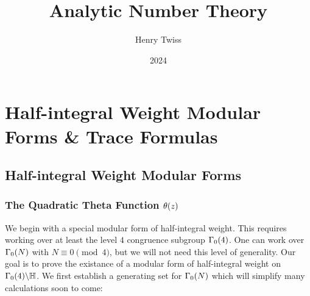 \documentclass[12pt,oneside]{book}
\title{Analytic Number Theory}
\author{Henry Twiss}
\date{2024}
\begin{document}
\maketitle
\pagestyle{empty}
\tableofcontents
\setcounter{page}{0}

 \part{Half-integral Weight Modular Forms \& Trace Formulas}
  \chapter{Half-integral Weight Modular Forms}
    \section{The Quadratic Theta Function \texorpdfstring{$\theta(z)$}{O(z)}}
      We begin with a special modular form of half-integral weight. This requires working over at least the level $4$ congruence subgroup $\Gamma_{0}(4)$. One can work over $\Gamma_{0}(N)$ with $N \equiv 0 \pmod{4}$, but we will not need this level of generality. Our goal is to prove the existance of a modular form of half-integral weight on $\Gamma_{0}(4)\backslash\mathbb{H}$. We first establish a generating set for $\Gamma_{0}(N)$ which will simplify many calculations soon to come:
\end{document}
